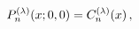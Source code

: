\[\mathop{P^{(\lambda)}_{n}\/}\nolimits\!\left(x;0,0\right)=\mathop{C^{(\lambda)%
}_{n}\/}\nolimits\!\left(x\right),\]